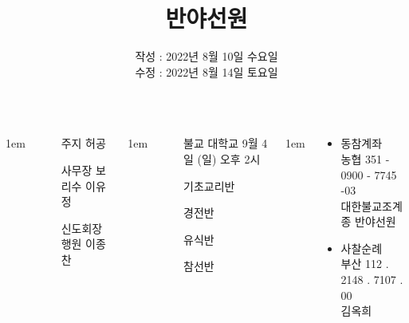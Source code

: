\documentclass[	20pt, 
							a1paper, 
							portrait, %
							margin=0mm, %
							innermargin=10mm,  		%
							colspace=5mm, 
							subcolspace=0mm
							]{tikzposter}
\title{반야선원}
\author{ 	작성 : 2022년 8월 10일 수요일 \\
			수정 : 2022년 8월 14일 토요일 }
\begin{document}
	\maketitle

	\begin{columns}


			{
					\setlength{\leftmargini}{7em}
					\setlength{\labelsep} {1em}
				\begin{LARGE}
					\begin{itemize}
					\item [주지] 허공 
					\item [사무장] 보리수 이유정
					\item [신도회장] 행원 이종찬
					\end{itemize}
				\end{LARGE}
			}

			{
					\setlength{\leftmargini}{9em}
					\setlength{\labelsep} {1em}
				\begin{LARGE}
					\begin{itemize}
					\item [불교 대학교] 9월 4일 (일) 오후 2시
					\item [기초교리반] 
					\item [경전반] 
					\item [유식반]
					\item [참선반]
					\end{itemize}
				\end{LARGE}
			}

			{
					\setlength{\leftmargini}{4em}
					\setlength{\labelsep} {1em}
				\begin{LARGE}
					\begin{itemize}
					\item 동참계좌\\
							농협 351 - 0900 - 7745 -03 \\
							대한불교조계종 반야선원
					\item 사찰순례\\
							부산  112 . 2148 . 7107 . 00 \\
							김옥희
					\end{itemize}
				\end{LARGE}
			}







\end{columns}
\end{document}
